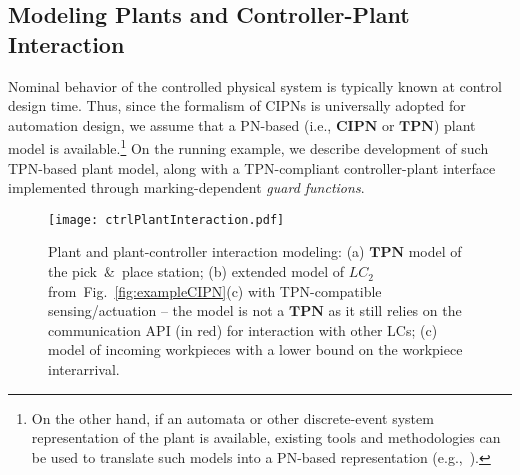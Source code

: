 \subsection{Modeling Plants and Controller-Plant Interaction}
\label{subsec:plantAndControllerInteraction}
Nominal behavior of the controlled physical system is typically known at control design time. Thus, since the formalism of CIPNs is universally adopted for automation design, we assume that a PN-based (i.e., $\mathbf{CIPN}$ or $\mathbf{TPN}$) plant model is available.\footnote{On the other hand, if an automata or other discrete-event system representation of the plant is available, existing tools and methodologies can be used to translate such models into a PN-based representation (e.g.,~\cite{PNtransformation1,PNtransformation2}).}
On the running example, we describe development of such TPN-based plant model, along with a TPN-compliant controller-plant interface implemented through marking-dependent \emph{guard functions}. %



%
\begin{figure}[t]
	\centering
    \texttt{[image: ctrlPlantInteraction.pdf]}
	\caption{Plant and plant-controller interaction modeling: (a) $\mathbf{TPN}$ model of the pick~\&~place station; %
	(b) extended model of $LC_2$ from~Fig.~\ref{fig:exampleCIPN}(c) with TPN-compatible sensing/actuation -- the model is not a $\mathbf{TPN}$ as it still relies on the communication API (in {\color{red}red}) for interaction with other LCs; (c) model of incoming workpieces with a lower bound on the workpiece interarrival.}
	\label{fig:ctrlPlantInteraction}
\end{figure}

